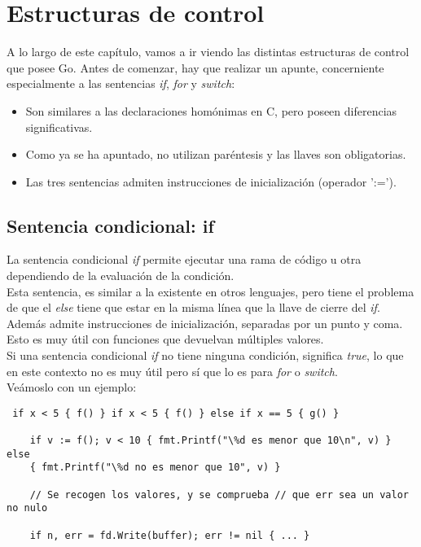
\chapter{Estructuras de control}

A lo largo de este capítulo, vamos a ir viendo las distintas estructuras de
control que posee Go. Antes de comenzar, hay que realizar un apunte,
concerniente especialmente a las sentencias \textit{if}, \textit{for}
y \textit{switch}:

\begin{itemize} \item Son similares a las declaraciones homónimas en C, pero
poseen diferencias significativas.  \item Como ya se ha apuntado, no utilizan
paréntesis y las llaves son obligatorias.  \item Las tres sentencias admiten
instrucciones de inicialización (operador ':=').  \end{itemize}

\section{Sentencia condicional: if\label{if}}

La sentencia condicional \textit{if} permite ejecutar una rama de código u otra
dependiendo de la evaluación de la condición.\\

Esta sentencia, es similar a la existente en otros lenguajes, pero tiene el
problema de que el \textit{else} tiene que estar en la misma línea que la llave
de cierre del \textit{if}.\\

Además admite instrucciones de inicialización, separadas por un punto y coma.
Esto es muy útil con funciones que devuelvan múltiples valores.\\

Si una sentencia condicional \textit{if} no tiene ninguna condición, significa
\textit{true}, lo que en este contexto no es muy útil pero sí que lo es para
\textit{for} o \textit{switch}.\\

Veámoslo con un ejemplo:

\begin{verbatim} if x < 5 { f() } if x < 5 { f() } else if x == 5 { g() }
    
	if v := f(); v < 10 { fmt.Printf("\%d es menor que 10\n", v) } else
	{ fmt.Printf("\%d no es menor que 10", v) }
    
	// Se recogen los valores, y se comprueba // que err sea un valor no nulo
    
	if n, err = fd.Write(buffer); err != nil { ... } \end{verbatim}

